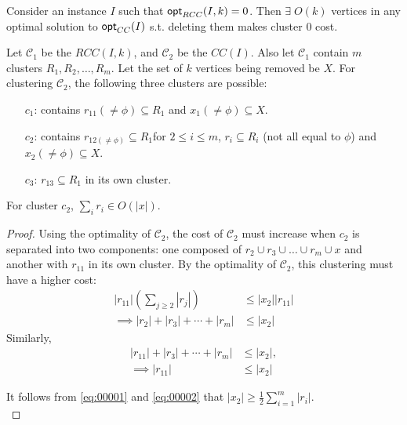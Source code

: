 \begin{theorem}\label{theorem:17}
Consider an instance $I$ such that $\mathsf{opt}_{RCC}(I,k)=0$. Then $\exists \; O(k)$ vertices in any optimal solution to $\mathsf{opt}_{CC}(I)$ s.t. deleting them makes cluster $0$ cost.
\end{theorem}
Let $\mathcal{C}_1$ be the $RCC(I,k)$, and $\mathcal{C}_2$ be the $CC(I)$. Also let $\mathcal{C}_1$ contain $m$ clusters $R_1, R_2, \dots, R_m$. Let the set of $k$ vertices being removed be $X$. For clustering $\mathcal{C}_2$, the following three clusters are possible:
\begin{enumerate}
    \item[$c_1$:] contains $r_{11}(\neq \phi)\subseteq R_1$ and $x_1(\neq \phi) \subseteq X$.
    \item[$c_2$:] contains $r_{12(\neq \phi)}\subseteq R_1$for $2\le i \le m$, $r_i \subseteq R_i$ (not all equal to $\phi$) and $x_2(\neq \phi) \subseteq X$.
    \item[$c_3$:] $r_{13}\subseteq R_1$ in its own cluster.
\end{enumerate}
\begin{lemma}\label{lemma-d1}
For cluster $c_2$, $\sum_{i}r_i \in O(|x|)$.
\end{lemma}
\begin{proof}
Using the optimality of $\mathcal{C}_2$, the cost of $\mathcal{C}_2$ must increase when $c_2$ is separated into two components: one composed of $r_2 \cup r_3 \cup \dots \cup r_m \cup x $ and another with $r_{11}$ in its own cluster. By the optimality of $\mathcal{C}_2$, this clustering must have a higher cost:
    \begin{align}
        |r_{11}| \left( \sum_{j \ge 2} |r_j| \right) &\leq |x_2| |r_{11}| \nonumber\\
        \implies |r_2| + |r_3| + \cdots + |r_m| &\leq |x_2| \label{eq:00001}
    \end{align}
    Similarly,
    \begin{align}
        |r_{11}| + |r_3| + \cdots + |r_m| &\leq |x_2|, \nonumber\\
        \implies |r_{11}| &\leq |x_2| \label{eq:00002}
    \end{align}

    It follows from \eqref{eq:00001} and \eqref{eq:00002} that $|x_2| \ge \frac12 \sum_{i=1}^{m} |r_i|$.\\
\end{proof}

